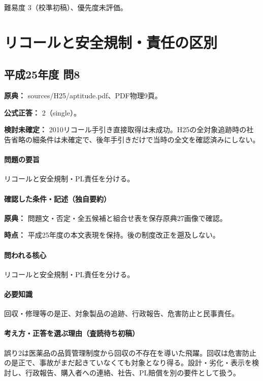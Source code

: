 \par 難易度 3（校準初稿）、優先度未評価。

\section{リコールと安全規制・責任の区別}

\subsection{平成25年度 問8}
\label{q:h25-reg-apt-08}

\noindent\textbf{原典：} sources/H25/aptitude.pdf、PDF物理9頁。

\textbf{公式正答：} 2（single）。

\par\textbf{検討未確定：} 2010リコール手引き直接取得は未成功。H25の全対象追跡時の社告省略の細条件は未確定で、後年手引きだけで当時の全文を確認済みにしない。

\paragraph{問題の要旨} リコールと安全規制・PL責任を分ける。

\paragraph{確認した条件・記述（独自要約）}\mbox{}\par

\noindent\textbf{原典：} 問題文・否定・全五候補と組合せ表を保存原典27画像で確認。\par

\noindent\textbf{時点：} 平成25年度の本文表現を保持。後の制度改正を遡及しない。\par

\paragraph{問われる核心} リコールと安全規制・PL責任を分ける。

\paragraph{必要知識} 回収・修理等の是正、対象製品の追跡、行政報告、危害防止と民事責任。

\paragraph{考え方・正答を選ぶ理由（査読待ち初稿）} 誤り2は医薬品の品質管理制度から回収の不存在を導いた飛躍。回収は危害防止の是正で、事故がまだ起きていなくても対象となり得る。設計・劣化・表示を検討し、行政報告、購入者への連絡、社告、PL賠償を別の要件として扱う。

